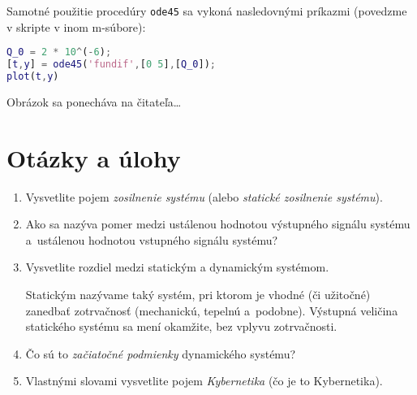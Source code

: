 \documentclass[a4paper, 10pt, ]{article}
\begin{document}
Samotné použitie procedúry \verb|ode45| sa vykoná nasledovnými príkazmi (povedzme v skripte v inom m-súbore):
\begin{lstlisting}[language=Matlab,]
Q_0 = 2 * 10^(-6);
[t,y] = ode45('fundif',[0 5],[Q_0]);
plot(t,y)
\end{lstlisting}
Obrázok sa ponecháva na čitateľa\ldots











\section{Otázky a úlohy}

\begin{enumerate}[leftmargin=0pt, labelsep=3mm, itemsep=0pt]

	\item Vysvetlite pojem \emph{zosilnenie systému} (alebo \emph{statické zosilnenie systému}).

    \item Ako sa nazýva pomer medzi ustálenou hodnotou výstupného signálu systému a~ustálenou hodnotou vstupného signálu systému? 
    	
    \item Vysvetlite rozdiel medzi statickým a dynamickým systémom.

    {\color{Gray} \scriptsize Statickým nazývame taký systém, pri ktorom je vhodné (či užitočné) zanedbať zotrvačnosť (mechanickú, tepelnú a~podobne). Výstupná veličina statického systému sa mení okamžite, bez vplyvu zotrvačnosti.}
    
    \item Čo sú to \emph{začiatočné podmienky} dynamického systému?
    
    \item Vlastnými slovami vysvetlite pojem \emph{Kybernetika} (čo je to Kybernetika).

\end{enumerate}



\renewcommand{\refname}{Odporúčaná literatúra}

\nocite{AsM08se}
{}

\end{document}
